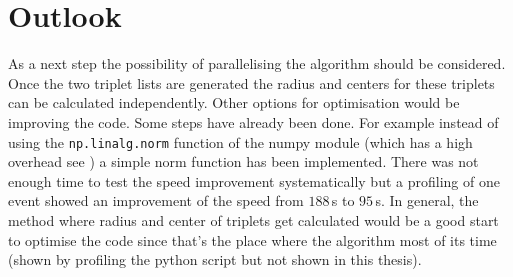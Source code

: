 \documentclass[11pt]{scrreprt}
\begin{document}
\section{Outlook} %
\label{sec:outlook}
As a next step the possibility of parallelising the algorithm should be considered. Once the two triplet lists are generated the radius and centers
for these triplets can be calculated independently.
Other options for optimisation would be improving the code. Some steps have already been done. For example instead of using the \texttt{np.linalg.norm} function of the numpy module (which has a high overhead see \cite{NumpyNorm}) a simple norm function has been implemented. There was not enough time to test the speed improvement systematically but a profiling of one event showed an improvement of the speed from $188$\,s to $95$\,s. In general, the method where
radius and center of triplets get calculated would be a good start to optimise the code since that's the place where the algorithm most of
 its time (shown by profiling the python script but not shown in this thesis).

\printbibliography
\end{document}
